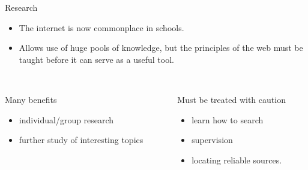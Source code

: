 \documentclass{beamer}
\begin{document}
\begin{frame}{Research}
    \begin{itemize}
        \item The internet is now commonplace in schools.
        \item Allows use of huge pools of knowledge, but the principles of the web must be taught before it can serve as a useful tool.\\~\\
    \end{itemize}
    \begin{columns}
           \begin{column}[l]{5cm}
            Many benefits
            \begin{itemize}
                \item individual/group research
                \item further study of interesting topics
            \end{itemize}
        \end{column}
        \begin{column}[r]{5cm}
            Must be treated with caution
            \begin{itemize}
                \item learn how to search
                \item supervision
                \item locating reliable sources.
            \end{itemize}
        \end{column}
    \end{columns}
\end{frame}
\end{document}
